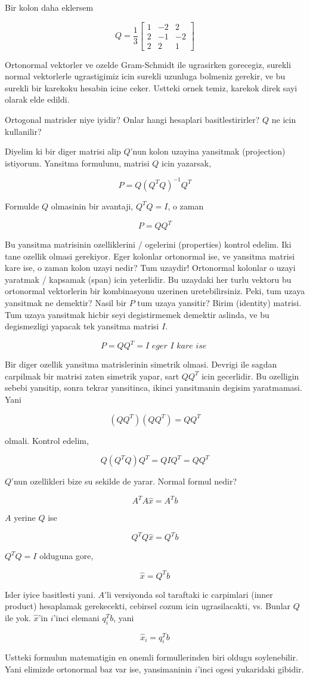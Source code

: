 \documentclass[12pt,fleqn]{article}\usepackage{../common}
\begin{document}
Bir kolon daha eklersem 

\[ Q = \frac{ 1}{3}
\left[\begin{array}{rrr}
1 & -2 & 2\\
2 & -1 & -2 \\
2 & 2 & 1
\end{array}\right]
 \]

Ortonormal vektorler ve ozelde Gram-Schmidt ile ugrasirken gorecegiz,
surekli normal vektorlerle ugrastigimiz icin surekli uzunluga bolmeniz
gerekir, ve bu surekli bir karekoku hesabin icine ceker. Ustteki ornek
temiz, karekok direk sayi olarak elde edildi. 

Ortogonal matrisler niye iyidir? Onlar hangi hesaplari basitlestirirler?
$Q$ ne icin kullanilir? 

Diyelim ki bir diger matrisi alip $Q$'nun kolon uzayina yansitmak
(projection) istiyorum. Yansitma formulunu, matrisi $Q$ icin yazarsak,

\[ P = Q (Q^TQ)^{-1}Q^T \]

Formulde $Q$ olmasinin bir avantaji, $Q^TQ = I$, o zaman 

\[ P = Q Q^T \]

Bu yansitma matrisinin ozelliklerini / ogelerini (properties) kontrol
edelim. Iki tane ozellik olmasi gerekiyor. Eger kolonlar ortonormal ise, ve
yansitma matrisi kare ise, o zaman kolon uzayi nedir? Tum uzaydir!
Ortonormal kolonlar o uzayi yaratmak / kapsamak (span) icin
yeterlidir. Bu uzaydaki her turlu vektoru bu ortonormal vektorlerin bir
kombinasyonu uzerinen uretebilirsiniz. Peki, tum uzaya yansitmak ne
demektir? Nasil bir $P$ tum uzaya yansitir? Birim (identity) matrisi. Tum
uzaya yansitmak hicbir seyi degistirmemek demektir aslinda, ve bu
degismezligi yapacak tek yansitma matrisi $I$. 

\[ P = Q Q^T = I \textit{ eger I kare ise }\]

Bir diger ozellik yansitma matrislerinin simetrik olmasi. Devrigi ile
sagdan carpilmak bir matrisi zaten simetrik yapar, sart $QQ^T$ icin
gecerlidir. Bu ozelligin sebebi yansitip, sonra tekrar yansitinca, ikinci
yansitmanin degisim yaratmamasi. Yani 

\[ (QQ^T)(QQ^T) = QQ^T \]

olmali. Kontrol edelim,

\[ Q(Q^TQ)Q^T = QIQ^T = QQ^T\]

$Q$'nun ozellikleri bize su sekilde de yarar. Normal formul nedir? 

\[ A^TA\hat{x} = A^Tb \]

$A$ yerine $Q$ ise

\[ Q^TQ\hat{x} = Q^Tb \]

$Q^TQ = I$ olduguna gore, 

\[ \hat{x} = Q^Tb \]

Isler iyice basitlesti yani. $A$'li versiyonda sol taraftaki ic carpimlari
(inner product) hesaplamak gerekecekti, cebirsel cozum icin ugrasilacakti,
vs. Bunlar $Q$ ile yok. $\hat{x}$'in $i$'inci elemani $q_i^Tb$, yani 

\[ \hat{x}_i = q_i^Tb \]

Ustteki formulun matematigin en onemli formullerinden biri oldugu
soylenebilir. Yani elimizde ortonormal baz var ise, yansimaninin $i$'inci
ogesi yukaridaki gibidir. 
\end{document}
